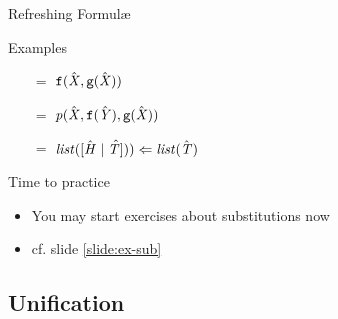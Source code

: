 \documentclass[presentation]{beamer}\mode<presentation>{\usetheme{AMSBolognaFC}}
\begin{document}
\begin{frame}[allowframebreaks]{Refreshing Formul\ae{}}
\begin{exampleblock}{Examples}
\begin{multicols}{2}
\begin{itemize}
                \item[$=$] $\mathtt{f}(\hat{\mathit{X}}, \mathtt{g}(\hat{\mathit{X}}))$
                \item[$=$] $\text{\textit{p}}(\hat{\mathit{X}}, \mathtt{f}(\hat{\mathit{Y}}), \mathtt{g}(\hat{\mathit{X}}))$
                \item[$=$] $\text{\textit{list}}([\hat{\mathit{H}} \mid \hat{\mathit{T} ]})) \Leftarrow \text{\textit{list}}(\hat{\mathit{T}})$
            \end{itemize}
        \end{multicols}
    \end{exampleblock}
\end{frame}

\begin{frame}
    \begin{block}{Time to practice}
        \begin{itemize}
            \item You may start exercises about \alert{substitutions} now
            \item cf. slide \ref{slide:ex-sub}
        \end{itemize}
    \end{block}
\end{frame}

\subsection{Unification}
\end{document}
